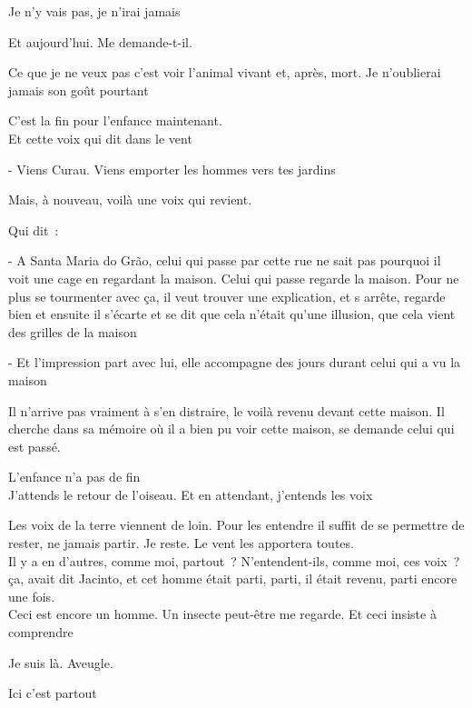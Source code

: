 Je n'y vais pas, je n'irai jamais

Et aujourd'hui. Me demande-t-il.

Ce que je ne veux pas c'est voir l'animal vivant et, après, mort. Je
n'oublierai jamais son goût pourtant

\pagebreak

C'est la fin pour l'enfance maintenant.\\

Et cette voix qui dit dans le vent

- Viens Curau. Viens emporter les hommes vers tes jardins

\pagebreak

Mais, à nouveau, voilà une voix qui revient.

Qui dit~:

- A Santa Maria do Grão, celui qui passe par cette rue ne sait pas
  pourquoi il voit une cage en regardant la maison. Celui qui passe
  regarde la maison. Pour ne plus se tourmenter avec ça, il veut trouver
  une explication, et s arrête, regarde bien et ensuite il s'écarte et
  se dit que cela n'était qu'une illusion, que cela vient des grilles de
  la maison

- Et l'impression part avec lui, elle accompagne des jours durant celui
  qui a vu la maison

Il n'arrive pas vraiment à s'en distraire, le voilà revenu devant cette
maison. Il cherche dans sa mémoire où il a bien pu voir cette maison, se
demande celui qui est passé.

L'enfance n'a pas de fin\\

J'attends le retour de l'oiseau. Et en attendant, j'entends les voix

Les voix de la terre viennent de loin. Pour les entendre il suffit de se
permettre de rester, ne jamais partir. Je reste. Le vent les apportera
toutes.\\

Il y a en d'autres, comme moi, partout~? N'entendent-ils, comme moi, ces
voix~?\\

ça, avait dit Jacinto, et cet homme était parti, parti, il était revenu,
parti encore une fois.\\

Ceci est encore un homme. Un insecte peut-être me regarde. Et ceci
insiste à comprendre

Je suis là. Aveugle.

Ici c'est partout\\


